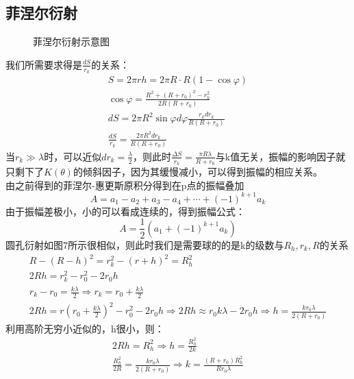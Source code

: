 \documentclass[UFT8]{article}
\begin{document}
\subsection{菲涅尔衍射}
\begin{figure}[htbp]
\begin{center}
\end{center}
\caption{菲涅尔衍射示意图}
\end{figure}
我们所需要求得是$\frac{dS}{r_k}$的关系：
\begin{gather*}
S=2\pi r h=2\pi  R\cdot R(1-\cos\varphi)\\
\cos\varphi=\frac{R^2+(R+r_0)^2-r_k^2}{2R(R+r_0)}\\
dS=2\pi R^2\sin\varphi d\varphi\frac{r_k dr_k}{R(R+r_0)}\\
\frac{dS}{r_k}=\frac{2\pi R^2 dr_k}{R(R+r_0)}
\end{gather*}
当$r_k\gg \lambda$时，可以近似$dr_k=\frac{\lambda}{2}$，则此时$\frac{\Delta S }{r_k}=\frac{\pi R \lambda}{R+r_0}$与k值无关，振幅的影响因子就只剩下了$K(\theta)$的倾斜因子，因为其缓慢减小，可以得到振幅的相应关系。\\
由之前得到的菲涅尔-惠更斯原积分得到在p点的振幅叠加
\[
	A=a_1-a_2+a_3-a_4+\cdots+(-1)^{k+1}a_k
\]
由于振幅差极小，小的可以看成连续的，得到振幅公式：
\[
	A=\frac{1}{2}(a_1+(-1)^{k+1}a_{k})
\]
圆孔衍射如图7所示很相似，则此时我们是需要球的的是k的级数与$R_h,r_k,R$的关系
\begin{gather*}
R-(R-h)^{2}=r_k^2-(r+h)^2=R_h^2\\
2Rh=r_k^2-r_0^2-2r_0h\\
r_k-r_0=\frac{k\lambda}{2}\Rightarrow r_k=r_0+\frac{k\lambda}{2}\\
2Rh=r(r_0+\frac{k\lambda}{2})^2-r_0^2-2r_0h\Rightarrow 2Rh\approx r_0k\lambda -2r_0 h\Rightarrow h=\frac{kr_0 \lambda }{2(R+r_0)}
\end{gather*}
利用高阶无穷小近似的，h很小，则：
\begin{gather*}
2Rh=R_{h}^2\Rightarrow h=\frac{R_h^{2}}{2k}\\
\frac{R_h^2}{2R}=\frac{kr_0\lambda}{2(R+r_0)}\Rightarrow k=\frac{(R+r_0)R_h^2}{Rr_0\lambda }
\end{gather*}
\end{document}
